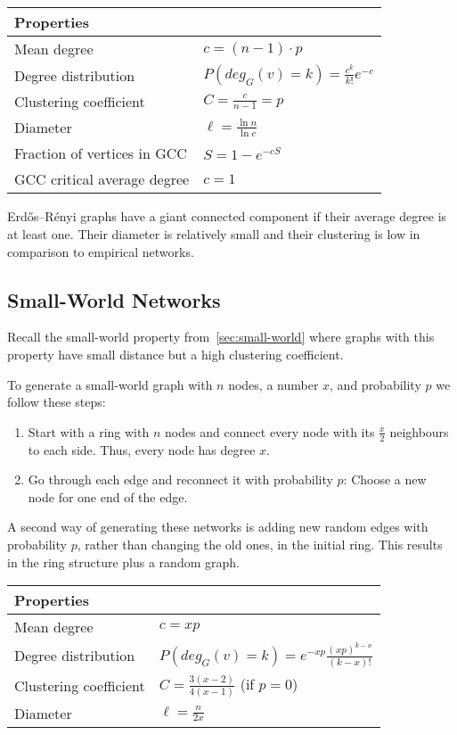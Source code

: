 \documentclass[english]{panikzettel}
\begin{document}
\begin{center}
    \begin{tabular}{|l|l|}
        Properties & \\ \hline
        Mean degree & $c = (n-1) \cdot p$ \\
        Degree distribution & $P(deg_G(v) = k) = \frac{c^k}{k!}e^{-c}$ \\
        Clustering coefficient & $C = \frac{c}{n-1} = p$ \\
        Diameter & $\ell = \frac{\ln n}{\ln c}$ \\
        Fraction of vertices in GCC & $S = 1 - e^{-cS}$ \\
        GCC critical average degree & $c=1$ \\
    \end{tabular}
\end{center}
\smallskip

Erdős–Rényi graphs have a giant connected component if their average degree is at least one.
Their diameter is relatively small and their clustering is low in comparison to empirical networks.

\subsection{Small-World Networks}

Recall the small-world property from~\cref{sec:small-world} where graphs with this property have small distance but a high clustering coefficient.

To generate a small-world graph with $n$ nodes, a number $x$, and probability $p$ we follow these steps:
\begin{enumerate}
    \item Start with a ring with $n$ nodes and connect every node with its $\frac{x}{2}$ neighbours to each side. Thus, every node has degree $x$.
    \item Go through each edge and reconnect it with probability $p$: Choose a new node for one end of the edge.
\end{enumerate}

A second way of generating these networks is adding new random edges with probability $p$, rather than changing the old ones, in the initial ring. This results in the ring structure plus a random graph.

\begin{center}
    \begin{tabular}{|l|l|}
        Properties & \\ \hline
        Mean degree & $c = xp$ \\
        Degree distribution & $P(deg_G(v) = k) = e^{-xp}\frac{(xp)^{k-x}}{(k-x)!}$ \\
        Clustering coefficient & $C = \frac{3(x-2)}{4(x-1)}$ (if $p = 0$)\\
        Diameter & $\ell = \frac{n}{2x}$ \\
    \end{tabular}
\end{center}
\end{document}
